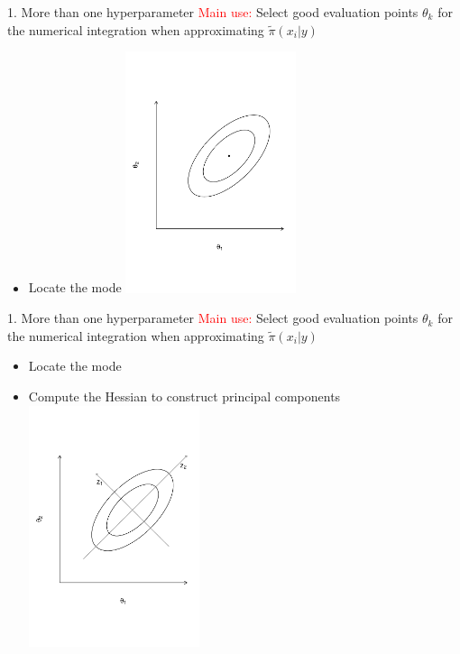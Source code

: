 \documentclass[
  ignorenonframetext,
]{beamer}
\providecommand{\tightlist}{%
  \setlength{\itemsep}{0pt}\setlength{\parskip}{0pt}}
\begin{document}
\begin{frame}{1. More than one hyperparameter}
\protect\hypertarget{more-than-one-hyperparameter}{}
\textcolor{red}{Main use:} Select good evaluation points \({\theta}_k\)
for the numerical integration when approximating
\(\widetilde{\pi}(x_i|{y})\)

\begin{itemize}
\tightlist
\item
  Locate the mode \includegraphics[width=5cm]{./graphics/ellipse1}
\end{itemize}
\end{frame}

\begin{frame}{1. More than one hyperparameter}
\protect\hypertarget{more-than-one-hyperparameter-1}{}
\textcolor{red}{Main use:} Select good evaluation points \({\theta}_k\)
for the numerical integration when approximating
\(\widetilde{\pi}(x_i|{y})\)

\begin{itemize}
\tightlist
\item
  Locate the mode
\item
  Compute the Hessian to construct principal components
  \includegraphics[width=5cm]{./graphics/ellipse2}
\end{itemize}
\end{frame}
\end{document}
